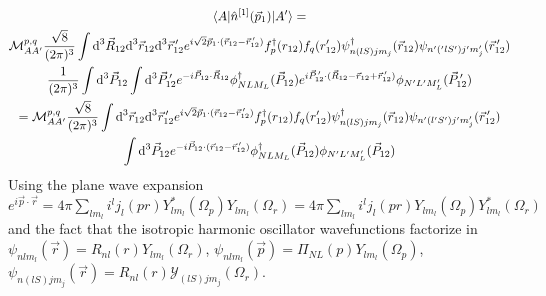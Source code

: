 \documentclass[10pt]{article}
\begin{document}
\begin{multline*}
	\braket{ A | \hat{n}^{[1]}(\vec{p}_1) | A'} = \\
  \mathcal{M}_{A A'}^{p,q} \frac{\sqrt{8}}{(2 \pi)^{3}} \int \text{d}^{3} \vec{R}_{12} \text{d}^{3} \vec{r}_{12} \text{d}^{3} \vec{r}_{12}^{\, \prime}  e^{ i \sqrt{2} \vec{p}_{1} \cdot ( \vec{r}_{12} - \vec{r}_{12}^{\, \prime}) }  f_{p}^{\dagger}(r_{12}) f_{q}(r_{12}') \psi_{ n (lS) j m_j}^{\dagger}(\vec{r}_{12}) \psi_{ n' ('lS') j' m_j'}(\vec{r}_{12}^{\, \prime})  \\
   \frac{1}{(2 \pi)^{3}} \int \text{d}^{3} \vec{P}_{12} \int \text{d}^{3} \vec{P}_{12}^{\, \prime} e^{ -i \vec{P}_{12} \cdot \vec{R}_{12}} \phi_{N L M_L}^{\dagger}(\vec{P}_{12}) e^{ i \vec{P}_{12}^{\, \prime} \cdot ( \vec{R}_{12} - \vec{r}_{12} + \vec{r}_{12}^{\, \prime})} \phi_{N' L' M_L'}(\vec{P}_{12}^{\, \prime}) \\
   = \mathcal{M}_{A A'}^{p,q} \frac{\sqrt{8}}{(2 \pi)^{3}} \int \text{d}^{3} \vec{r}_{12} \text{d}^{3} \vec{r}_{12}^{\, \prime}  e^{ i \sqrt{2} \vec{p}_{1} \cdot ( \vec{r}_{12} - \vec{r}_{12}^{\, \prime}) } f_{p}^{\dagger}(r_{12}) f_{q}(r_{12}')  \psi_{ n (lS) j m_j}^{\dagger}(\vec{r}_{12}) \psi_{ n' (l'S') j' m_j'}(\vec{r}_{12}^{\, \prime}) \\
   \int \text{d}^{3} \vec{P}_{12} e^{ -i \vec{P}_{12} \cdot (\vec{r}_{12} - \vec{r}_{12}^{\, \prime})} \phi_{N L M_L}^{\dagger}(\vec{P}_{12}) \phi_{N' L' M_L'}(\vec{P}_{12}) 
\end{multline*}
Using the plane wave expansion $e^{i \vec{p} \cdot \vec{r}} = 4 \pi \sum_{l m_l} i^{l} j_{l}(p r) Y_{l m_l}^{*}(\Omega_{p}) Y_{l m_l}(\Omega_{r}) = 4 \pi \sum_{l m_l} i^{l} j_{l}(p r) Y_{l m_l}(\Omega_{p}) Y_{l m_l}^{*}(\Omega_{r})$ and the fact that the isotropic harmonic oscillator wavefunctions factorize in $\psi_{n l m_l}(\vec{r}) = R_{n l}(r) Y_{l m_l}(\Omega_{r})$, $\psi_{n l m_l}(\vec{p}) = \Pi_{N L}(p) Y_{l m_l}(\Omega_{p})$, $\psi_{n (lS) j m_j}(\vec{r}) = R_{n l}(r) \mathcal{Y}_{(lS) j m_j}(\Omega_{r})$.
\end{document}
